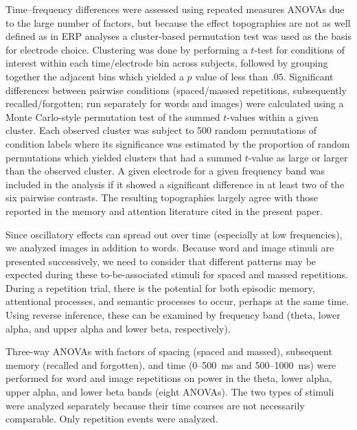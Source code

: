 Time--frequency differences were assessed using repeated measures ANOVAs due to the large number of factors, but because the effect topographies are not as well defined as in ERP analyses a cluster-based permutation test \cite{MariOost2007} was used as the basis for electrode choice.  Clustering was done by performing a $t$-test for conditions of interest within each time/electrode bin across subjects, followed by grouping together the adjacent bins which yielded a $p$ value of less than $.05$.  Significant differences between pairwise conditions (spaced/massed repetitions, subsequently recalled/forgotten; run separately for words and images) were calculated using a Monte Carlo-style permutation test of the summed $t$-values within a given cluster.  Each observed cluster was subject to 500 random permutations of condition labels where its significance was estimated by the proportion of random permutations which yielded clusters that had a summed $t$-value as large or larger than the observed cluster.  A given electrode for a given frequency band was included in the analysis if it showed a significant difference in at least two of the six pairwise contrasts.  The resulting topographies largely agree with those reported in the memory and attention literature cited in the present paper.




Since oscillatory effects can spread out over time (especially at low frequencies), we analyzed images in addition to words.
Because word and image stimuli are presented successively, we need to consider that different patterns may be expected during these to-be-associated stimuli for spaced and massed repetitions.  During a repetition trial, there is the potential for both episodic memory, attentional processes, and semantic processes to occur, perhaps at the same time.  Using reverse inference, these can be examined by frequency band (theta, lower alpha, and upper alpha and lower beta, respectively).

Three-way ANOVAs with factors of spacing (spaced and massed), subsequent memory (recalled and forgotten), and time (0--500~ms and 500--1000~ms) were performed for word and image repetitions on power in the theta, lower alpha, upper alpha, and lower beta bands (eight ANOVAs).  The two types of stimuli were analyzed separately because their time courses are not necessarily comparable.  Only repetition events were analyzed.

